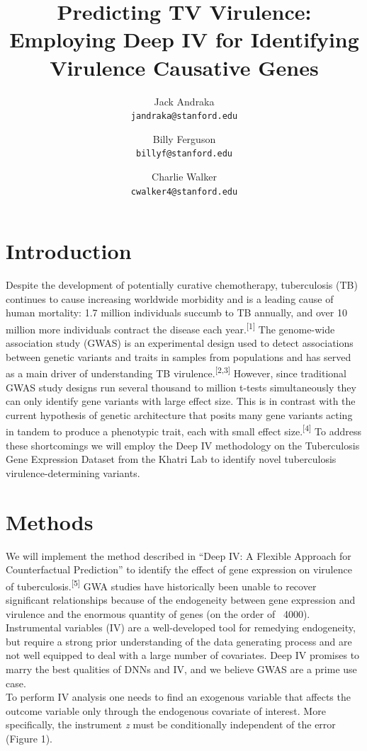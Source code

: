 \documentclass[11pt, oneside]{article}   	%
\title{Predicting TV Virulence: Employing Deep IV for Identifying Virulence Causative Genes}
\author{
	Jack Andraka\\ 
	\texttt{jandraka@stanford.edu}
	\and
	Billy Ferguson\\
	\texttt{billyf@stanford.edu}
	\and
	Charlie Walker\\
	\texttt{cwalker4@stanford.edu}
}
\date{}							%
\begin{document}
\maketitle
\section{Introduction}

Despite the development of potentially curative chemotherapy, tuberculosis (TB) continues to cause increasing worldwide morbidity and is a leading cause of human mortality: 1.7 million individuals succumb to TB annually, and over 10 million more individuals contract the disease each year.\textsuperscript{[1]} The genome-wide association study (GWAS) is an experimental design used to detect associations between genetic variants and traits in samples from populations and has served as a main driver of understanding TB virulence.\textsuperscript{[2,3]} However, since traditional GWAS study designs run several thousand to million t-tests simultaneously they can only identify gene variants with large effect size. This is in contrast with the current hypothesis of genetic architecture that posits many gene variants acting in tandem to produce a phenotypic trait, each with small effect size.\textsuperscript{[4]} To address these shortcomings we will employ the Deep IV methodology on the Tuberculosis Gene Expression Dataset from the Khatri Lab to identify novel tuberculosis virulence-determining variants. 

\section{Methods}
We will implement the method described in ``Deep IV: A Flexible Approach for Counterfactual Prediction'' to identify the effect of gene expression on virulence of tuberculosis.\textsuperscript{[5]} GWA studies have historically been unable to recover significant relationships because of the endogeneity between gene expression and virulence and the enormous quantity of genes (on the order of ~4000). Instrumental variables (IV) are a well-developed tool for remedying endogeneity, but require a strong prior understanding of the data generating process and are not well equipped to deal with a large number of covariates. Deep IV promises to marry the best qualities of DNNs and IV, and we believe GWAS are a prime use case. \\

To perform IV analysis one needs to find an exogenous variable that affects the outcome variable only through the endogenous covariate of interest. More specifically, the instrument \emph{z} must be conditionally independent of the error (Figure 1).\\
\end{document}
